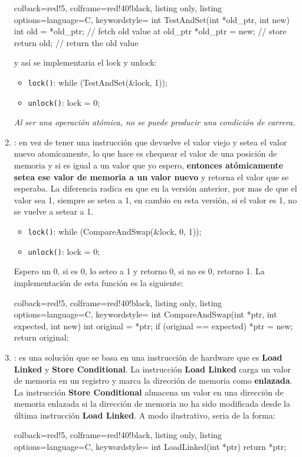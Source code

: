 \documentclass[openany]{book}
\begin{document}
\begin{enumerate}
    \begin{tcblisting}{colback=red!5, colframe=red!40!black, listing only, listing options={language=C, keywordstyle=\color{blue!35!white}\bfseries}}
    int TestAndSet(int *old_ptr, int new) {
        int old = *old_ptr; // fetch old value at old_ptr
        *old_ptr = new; // store
        return old; // return the old value
    }
    \end{tcblisting}
    y así se implementaria el lock y unlock:
    \begin{itemize}
        \item \texttt{lock()}: while (TestAndSet(\&lock, 1)); 
        \item \texttt{unlock()}: lock = 0;
    \end{itemize}
    \textit{Al ser una operación atómica, no se puede producir una condición de carrera.}
    \item {}: en vez de tener una instrucción que devuelve el valor viejo y setea el valor nuevo atomicamente, lo que hace es chequear el valor de una posición de memoria y si es igual a un valor que yo espero, \textbf{entonces atómicamente setea ese valor de memoria a un valor nuevo} y retorna el valor que se esperaba. La diferencia radica en que en la versión anterior, por mas de que el valor sea 1, siempre se setea a 1, en cambio en esta versión, si el valor es 1, no se vuelve a setear a 1.
    \begin{itemize}
        \item \texttt{lock()}: while (CompareAndSwap(\&lock, 0, 1)); 
        \item \texttt{unlock()}: lock = 0;
    \end{itemize}
    Espero un 0, si es 0, lo seteo a 1 y retorno 0, si no es 0, retorno 1. La implementación de esta función es la siguiente:
    \begin{tcblisting}{colback=red!5, colframe=red!40!black, listing only, listing options={language=C, keywordstyle=\color{blue!35!white}\bfseries}}
    int CompareAndSwap(int *ptr, int expected, int new) {
        int original = *ptr;
        if (original == expected)
            *ptr = new;
        return original;
    }
    \end{tcblisting}            
    \item {}: es una solución que se basa en una instrucción de hardware que es \textbf{Load Linked} y \textbf{Store Conditional}. La instrucción \textbf{Load Linked} carga un valor de memoria en un registro y marca la dirección de memoria como \textbf{enlazada}. La instrucción \textbf{Store Conditional} almacena un valor en una dirección de memoria enlazada si la dirección de memoria no ha sido modificada desde la última instrucción \textbf{Load Linked}. A modo ilustrativo, seria de la forma:
    \begin{tcblisting}{colback=red!5, colframe=red!40!black, listing only, listing options={language=C, keywordstyle=\color{blue!35!white}\bfseries}}
    int LoadLinked(int *ptr) {
        return *ptr;
    }


\end{tcblisting}
\end{enumerate}
\end{document}
